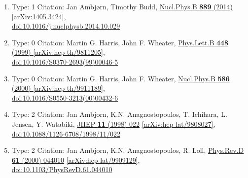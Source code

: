 \documentclass[a4paper,10pt]{article}
\begin{document}
\begin{enumerate}
\begin{enumerate}
  \item Type: 1 Citation: Jan Ambjørn, Timothy Budd, \href{https://www.doi.org/10.1016/j.nuclphysb.2014.10.029}{Nucl.Phys.B {\bf 889} (2014) }  \href{https://arxiv.org/abs/1405.3424}{[arXiv:1405.3424]},\\\href{https://www.doi.org/10.1016/j.nuclphysb.2014.10.029}{doi:10.1016/j.nuclphysb.2014.10.029}
  \item Type: 0 Citation: Martin G. Harris, John F. Wheater, \href{https://www.doi.org/10.1016/S0370-2693(99)00046-5}{Phys.Lett.B {\bf 448} (1999) }  \href{https://arxiv.org/abs/hep-th/9811205}{[arXiv:hep-th/9811205]},\\\href{https://www.doi.org/10.1016/S0370-2693(99)00046-5}{doi:10.1016/S0370-2693(99)00046-5}
  \item Type: 0 Citation: Martin G. Harris, John F. Wheater, \href{https://www.doi.org/10.1016/S0550-3213(00)00432-6}{Nucl.Phys.B {\bf 586} (2000) }  \href{https://arxiv.org/abs/hep-th/9911189}{[arXiv:hep-th/9911189]},\\\href{https://www.doi.org/10.1016/S0550-3213(00)00432-6}{doi:10.1016/S0550-3213(00)00432-6}
  \item Type: 2 Citation: Jan Ambjorn, K.N. Anagnostopoulos, T. Ichihara, L. Jensen, Y. Watabiki, \href{https://www.doi.org/10.1088/1126-6708/1998/11/022}{JHEP {\bf 11} (1998) 022}  \href{https://arxiv.org/abs/hep-lat/9808027}{[arXiv:hep-lat/9808027]},\\\href{https://www.doi.org/10.1088/1126-6708/1998/11/022}{doi:10.1088/1126-6708/1998/11/022}
  \item Type: 2 Citation: Jan Ambjorn, K.N. Anagnostopoulos, R. Loll, \href{https://www.doi.org/10.1103/PhysRevD.61.044010}{Phys.Rev.D {\bf 61} (2000) 044010}  \href{https://arxiv.org/abs/hep-lat/9909129}{[arXiv:hep-lat/9909129]},\\\href{https://www.doi.org/10.1103/PhysRevD.61.044010}{doi:10.1103/PhysRevD.61.044010}

\end{enumerate}
\end{enumerate}
\end{document}
